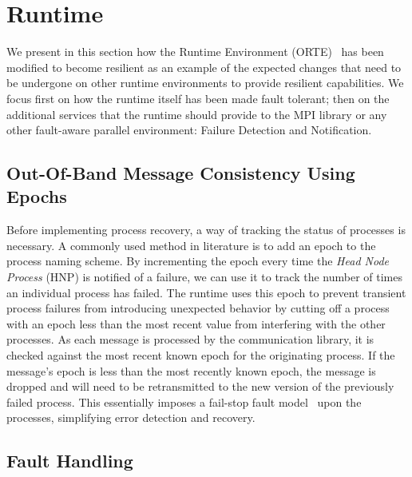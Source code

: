\section{Runtime} \label{sect:runtime}

We present in this section how the \ompi Runtime Environment
(ORTE)~\cite{Castain:2008dx} has been modified to become resilient as an example
of the expected changes that need to be undergone on other runtime environments
to provide resilient capabilities. We focus first on how the runtime itself has
been made fault tolerant; then on the additional services that the runtime
should provide to the MPI library or any other fault-aware parallel environment:
Failure Detection and Notification. 

\subsection{Out-Of-Band Message Consistency Using Epochs} \label{subsect:epochs}

Before implementing process recovery, a way of tracking the status of processes
is necessary. A commonly used method in literature is to add an epoch to the
process naming scheme. By incrementing the epoch every time the {\em Head Node
Process} (HNP) is notified of a failure, we can use it to track the number of
times an individual process has failed.  The runtime uses this epoch to prevent
transient process failures from introducing unexpected behavior by cutting off a
process with an epoch less than the most recent value from interfering with the
other processes.  As each message is processed by the communication library, it
is checked against the most recent known epoch for the originating process. If
the message's epoch is less than the most recently known epoch, the message is
dropped and will need to be retransmitted to the new version of the previously
failed process. This essentially imposes a fail-stop fault model~\cite{FLP85}
upon the processes, simplifying error detection and recovery.
	
\subsection{Fault Handling} \label{subsect:failure_handling}

